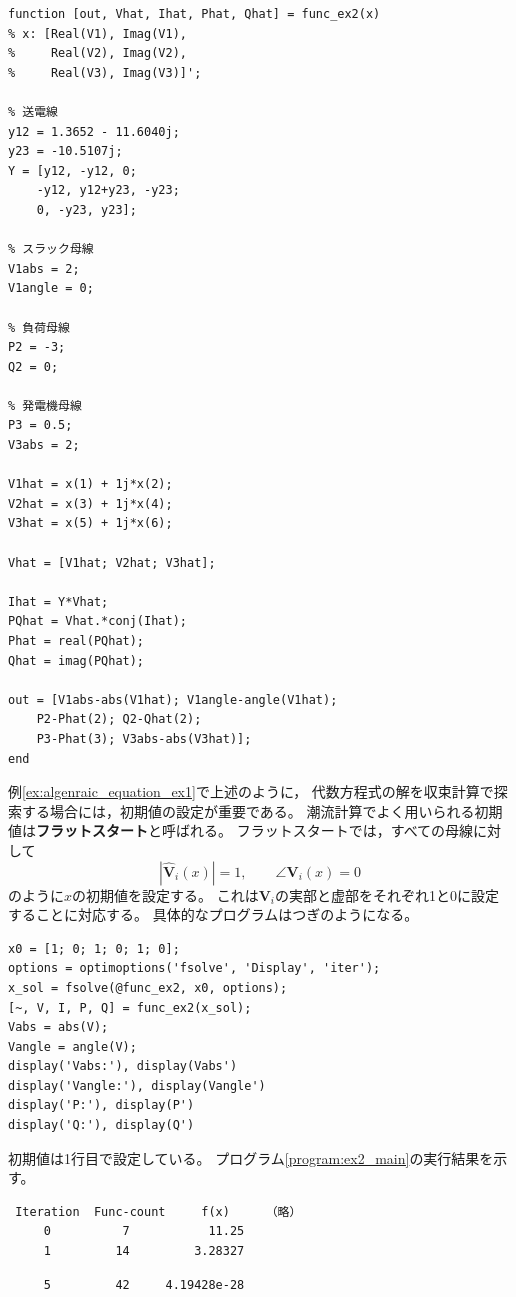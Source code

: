 \documentclass[tombow,dvipdfmx]{corona-a5-1.1}
\begin{document}
{\begin{例}[潮流計算の実装法]
\smallskip
\begin{PROGRAMA}[count, title={func\_ex2.m}]\label{program:ex2}
\begin{verbatim}
function [out, Vhat, Ihat, Phat, Qhat] = func_ex2(x)
% x: [Real(V1), Imag(V1),
%     Real(V2), Imag(V2),
%     Real(V3), Imag(V3)]';

% 送電線
y12 = 1.3652 - 11.6040j;
y23 = -10.5107j;
Y = [y12, -y12, 0;
    -y12, y12+y23, -y23;
    0, -y23, y23];

% スラック母線
V1abs = 2;
V1angle = 0;

% 負荷母線
P2 = -3;
Q2 = 0;

% 発電機母線
P3 = 0.5;
V3abs = 2;

V1hat = x(1) + 1j*x(2);
V2hat = x(3) + 1j*x(4);
V3hat = x(5) + 1j*x(6);

Vhat = [V1hat; V2hat; V3hat];

Ihat = Y*Vhat;
PQhat = Vhat.*conj(Ihat);
Phat = real(PQhat);
Qhat = imag(PQhat);

out = [V1abs-abs(V1hat); V1angle-angle(V1hat);
    P2-Phat(2); Q2-Qhat(2);
    P3-Phat(3); V3abs-abs(V3hat)];
end
\end{verbatim}
\end{PROGRAMA}

例\nobreak\ref{ex:algenraic_equation_ex1}で上述のように，
代数方程式の解を収束計算で探索する場合には，初期値の設定が重要である。
潮流計算でよく用いられる初期値は\textbf{フラットスタート}と呼ばれる。
フラットスタートでは，すべての母線に対して
\[
|\hat{\bm V}_i(x)|=1
,\qquad
\angle \bm V_i(x) = 0
\]
のように$x$の初期値を設定する。
これは$\bm V_i$の実部と虚部をそれぞれ1と0に設定することに対応する。
具体的なプログラムはつぎのようになる。

\smallskip
\begin{PROGRAMA}[count,title={main\_ex2.m}]\label{program:ex2_main}
\begin{verbatim}
x0 = [1; 0; 1; 0; 1; 0];
options = optimoptions('fsolve', 'Display', 'iter');
x_sol = fsolve(@func_ex2, x0, options);
[~, V, I, P, Q] = func_ex2(x_sol);
Vabs = abs(V);
Vangle = angle(V);
display('Vabs:'), display(Vabs')
display('Vangle:'), display(Vangle')
display('P:'), display(P')
display('Q:'), display(Q')
\end{verbatim}
\end{PROGRAMA}

初期値は1行目で設定している。
プログラム\nobreak\ref{program:ex2_main}の実行結果を示す。

\smallskip
\begin{実行結果}
\begin{verbatim}
 Iteration  Func-count     f(x)     （略）
     0          7           11.25 
     1         14         3.28327 
\end{verbatim}
\omitcode
\begin{verbatim}
     5         42     4.19428e-28


\end{verbatim}
\end{実行結果}
\end{例}}
\end{document}
